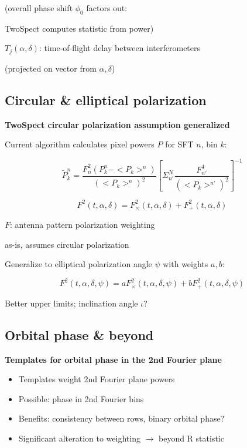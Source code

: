 (overall phase shift $\phi_{0}$ factors out: 


TwoSpect computes statistic from power)


$T_{j}(\alpha,\delta)$: time-of-flight delay between interferometers 


(projected on vector from $\alpha,\delta$)


\subsection{Circular \& elliptical polarization}


\textbf{TwoSpect circular polarization assumption generalized}


Current algorithm calculates pixel powers $P$ for SFT $n$, bin $k$:


\[
\tilde{P}_{k}^{n}=\frac{F_{n}^{2}(P_{k}^{n}-<P_{k}>^{n})}{(<P_{k}>^{n})^{2}}\left[\Sigma_{n'}^{N}\frac{F_{n'}^{4}}{(<P_{k}>^{n'})^{2}}\right]^{-1}
\]



\[
F^{2}(t,\alpha,\delta)=F_{\times}^{2}(t,\alpha,\delta)+F_{+}^{2}(t,\alpha,\delta)
\]



$F$: antenna pattern polarization weighting 


as-is, assumes circular polarization


Generalize to elliptical polarization angle $\psi$ with weights $a,b$:


\[
F^{2}(t,\alpha,\delta,\psi)=aF_{\times}^{2}(t,\alpha,\delta,\psi)+bF_{+}^{2}(t,\alpha,\delta,\psi)
\]



Better upper limits; inclination angle $\iota$?


\subsection{Orbital phase \& beyond}


\textbf{Templates for orbital phase in the 2nd Fourier plane}
\begin{itemize}
\item Templates weight 2nd Fourier plane powers
\item Possible: phase in 2nd Fourier bins
\item Benefits: consistency between rows, binary orbital phase?
\item Significant alteration to weighting $\rightarrow$ beyond R statistic
\end{itemize}

